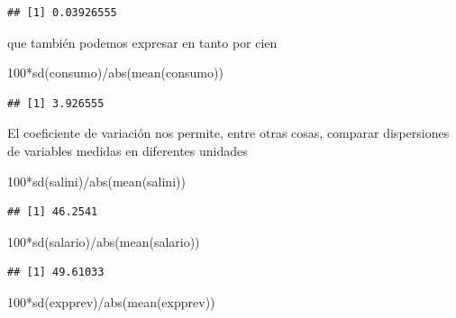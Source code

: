 \documentclass[
]{book}
\newenvironment{Shaded}{\begin{snugshade}}{\end{snugshade}}
\newcommand{\DecValTok}[1]{\textcolor[rgb]{0.00,0.00,0.81}{#1}}
\newcommand{\FunctionTok}[1]{\textcolor[rgb]{0.00,0.00,0.00}{#1}}
\newcommand{\NormalTok}[1]{#1}
\newcommand{\SpecialCharTok}[1]{\textcolor[rgb]{0.00,0.00,0.00}{#1}}
\theoremstyle{break}
\begin{document}
\begin{verbatim}
## [1] 0.03926555
\end{verbatim}

que también podemos expresar en tanto por cien

\begin{Shaded}
\begin{Highlighting}[]
\DecValTok{100}\SpecialCharTok{*}\FunctionTok{sd}\NormalTok{(consumo)}\SpecialCharTok{/}\FunctionTok{abs}\NormalTok{(}\FunctionTok{mean}\NormalTok{(consumo))}
\end{Highlighting}
\end{Shaded}

\begin{verbatim}
## [1] 3.926555
\end{verbatim}

El coeficiente de variación nos permite, entre otras cosas, comparar dispersiones de
variables medidas en diferentes unidades

\begin{Shaded}
\begin{Highlighting}[]
\DecValTok{100}\SpecialCharTok{*}\FunctionTok{sd}\NormalTok{(salini)}\SpecialCharTok{/}\FunctionTok{abs}\NormalTok{(}\FunctionTok{mean}\NormalTok{(salini))}
\end{Highlighting}
\end{Shaded}

\begin{verbatim}
## [1] 46.2541
\end{verbatim}

\begin{Shaded}
\begin{Highlighting}[]
\DecValTok{100}\SpecialCharTok{*}\FunctionTok{sd}\NormalTok{(salario)}\SpecialCharTok{/}\FunctionTok{abs}\NormalTok{(}\FunctionTok{mean}\NormalTok{(salario))}
\end{Highlighting}
\end{Shaded}

\begin{verbatim}
## [1] 49.61033
\end{verbatim}

\begin{Shaded}
\begin{Highlighting}[]
\DecValTok{100}\SpecialCharTok{*}\FunctionTok{sd}\NormalTok{(expprev)}\SpecialCharTok{/}\FunctionTok{abs}\NormalTok{(}\FunctionTok{mean}\NormalTok{(expprev))}
\end{Highlighting}
\end{Shaded}
\end{document}
